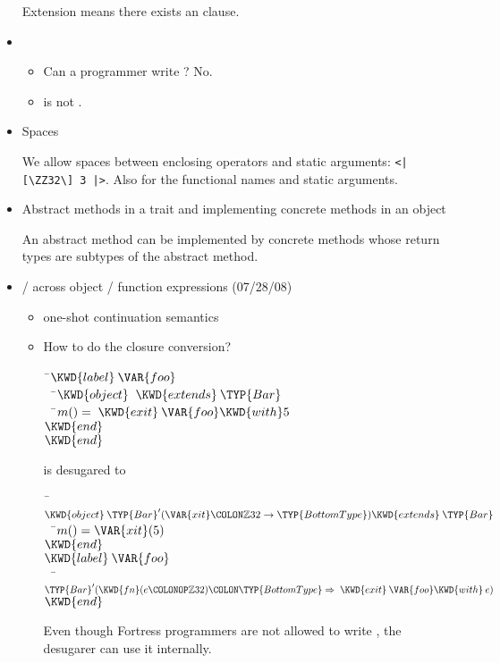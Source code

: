 \begin{itemize}
Extension means there exists an  clause.

\item {}
  \begin{itemize}
\item Can a programmer write ?  No.
\item {} is not .
  \end{itemize}

\item Spaces

We allow spaces between enclosing operators and static arguments: \verb+<| [\ZZ32\] 3 |>+.
Also for the functional names and static arguments.

\item Abstract methods in a trait and implementing concrete methods in an object

An abstract method can be implemented by concrete methods whose return types are
subtypes of the abstract method.

\item {} /  across object / function expressions (07/28/08)
  \begin{itemize}
\item one-shot continuation semantics
\item How to do the closure conversion?
\begin{Fortress}
{\tt~}\pushtabs\=\+\( \KWD{label}\:\VAR{foo}\)\\
{\tt~~}\pushtabs\=\+\(   \KWD{object}\;\;\KWD{extends}\:\TYP{Bar}\)\\
{\tt~~}\pushtabs\=\+\(     m() = \;\KWD{exit}\:\VAR{foo} \KWD{with} 5\)\-\\\poptabs
\(   \KWD{end}\)\-\\\poptabs
\( \KWD{end}\)\-\\\poptabs
\end{Fortress}
is desugared to
\begin{Fortress}
{\tt~}\pushtabs\=\+\( \KWD{object}\:\TYP{Bar}'(\VAR{xit}\COLON \mathbb{Z}32 \rightarrow \TYP{BottomType}) \KWD{extends}\:\TYP{Bar}\)\\
{\tt~~}\pushtabs\=\+\(   m() = \VAR{xit}(5)\)\-\\\poptabs
\( \KWD{end}\)\\
\( \KWD{label}\:\VAR{foo}\)\\
{\tt~~}\pushtabs\=\+\(   \TYP{Bar}'(\KWD{fn} (e\COLONOP\mathbb{Z}32)\COLON \TYP{BottomType} \Rightarrow\;\KWD{exit}\:\VAR{foo} \KWD{with}\:e)\)\-\\\poptabs
\( \KWD{end}\)\-\\\poptabs
\end{Fortress}
Even though Fortress programmers are not allowed to write ,
the desugarer can use it internally.
  \end{itemize}


\end{itemize}
